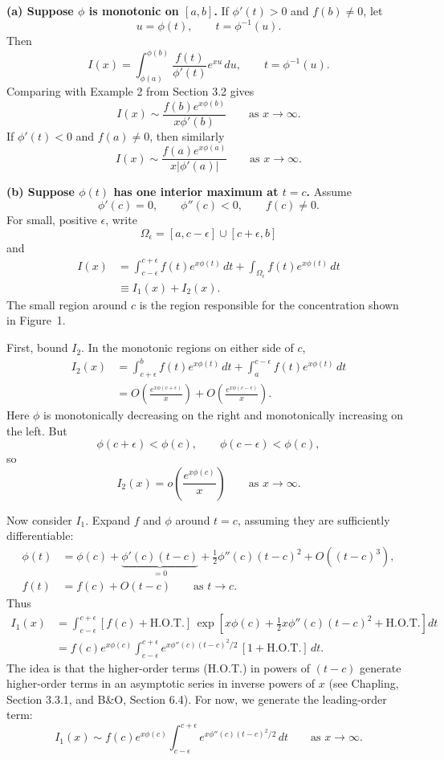 \documentclass[11pt,a4paper]{article}
\begin{document}
\noindent\textbf{(a) Suppose $\phi$ is monotonic on $[a,b]$.}
If $\phi'(t)>0$ and $f(b)\neq0$, let
\[
    u=\phi(t),\qquad t=\phi^{-1}(u).
\]
Then
\[
    I(x)=\int_{\phi(a)}^{\phi(b)}
    \frac{f(t)}{\phi'(t)}e^{xu}\,du,
    \qquad t=\phi^{-1}(u).
\]
Comparing with Example 2 from Section 3.2 gives
\[
    I(x)\sim\frac{f(b)e^{x\phi(b)}}{x\phi'(b)}
    \qquad\text{as }x\to\infty.
\]
If $\phi'(t)<0$ and $f(a)\neq0$, then similarly
\[
    I(x)\sim\frac{f(a)e^{x\phi(a)}}{x|\phi'(a)|}
    \qquad\text{as }x\to\infty.
\]

\noindent\textbf{(b) Suppose $\phi(t)$ has one interior maximum at $t=c$.}
Assume
\[
    \phi'(c)=0,\qquad \phi''(c)<0,\qquad f(c)\neq0.
\]
For small, positive $\epsilon$, write
\[
    \Omega_\epsilon=[a,c-\epsilon]\cup[c+\epsilon,b]
\]
and
\begin{align*}
    I(x)&=\int_{c-\epsilon}^{c+\epsilon}f(t)e^{x\phi(t)}\,dt
    +\int_{\Omega_\epsilon}f(t)e^{x\phi(t)}\,dt\\
    &\equiv I_1(x)+I_2(x).
\end{align*}
The small region around $c$ is the region responsible for the concentration
shown in Figure~1.

First, bound $I_2$. In the monotonic regions on either side of $c$,
\begin{align*}
    I_2(x)&=\int_{c+\epsilon}^b f(t)e^{x\phi(t)}\,dt
    +\int_a^{c-\epsilon}f(t)e^{x\phi(t)}\,dt\\
    &=O\!\left(\frac{e^{x\phi(c+\epsilon)}}{x}\right)
    +O\!\left(\frac{e^{x\phi(c-\epsilon)}}{x}\right).
\end{align*}
Here $\phi$ is monotonically decreasing on the right and monotonically
increasing on the left. But
\[
    \phi(c+\epsilon)<\phi(c),\qquad
    \phi(c-\epsilon)<\phi(c),
\]
so
\[
    I_2(x)=o\!\left(\frac{e^{x\phi(c)}}{x}\right)
    \qquad\text{as }x\to\infty.
\]

Now consider $I_1$. Expand $f$ and $\phi$ around $t=c$, assuming they are
sufficiently differentiable:
\begin{align*}
    \phi(t)&=\phi(c)+\underbrace{\phi'(c)(t-c)}_{=0}
    +\tfrac12\phi''(c)(t-c)^2+O((t-c)^3),\\
    f(t)&=f(c)+O(t-c)
    \qquad\text{as }t\to c.
\end{align*}
Thus
\begin{align*}
    I_1(x)
    &=\int_{c-\epsilon}^{c+\epsilon}
    [f(c)+\text{H.O.T.}]\,
    \exp\!\left[x\phi(c)+\tfrac12x\phi''(c)(t-c)^2
    +\text{H.O.T.}\right]dt\\
    &=f(c)e^{x\phi(c)}\int_{c-\epsilon}^{c+\epsilon}
    e^{x\phi''(c)(t-c)^2/2}\,[1+\text{H.O.T.}]\,dt.
\end{align*}
The idea is that the higher-order terms (H.O.T.) in powers of $(t-c)$
generate higher-order terms in an asymptotic series in inverse powers
of $x$ (see Chapling, Section 3.3.1, and B\&O, Section 6.4).
For now, we generate the leading-order term:
\[
    I_1(x)\sim f(c)e^{x\phi(c)}
    \int_{c-\epsilon}^{c+\epsilon}e^{x\phi''(c)(t-c)^2/2}\,dt
    \qquad\text{as }x\to\infty.
\]
\end{document}

